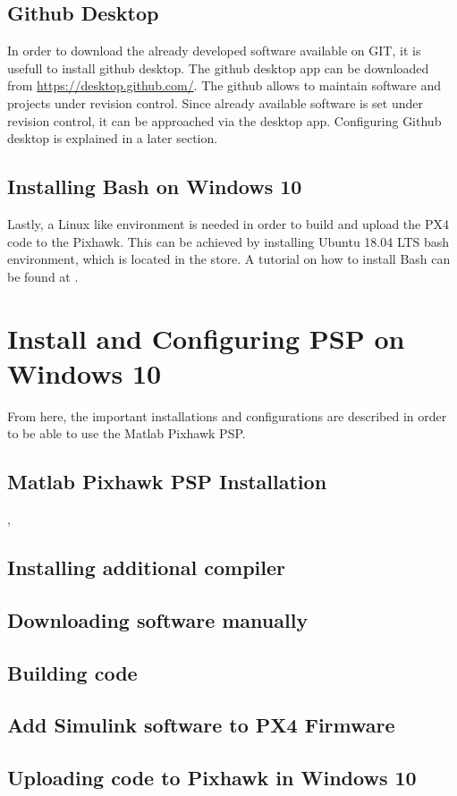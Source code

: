 \subsection{Github Desktop}
In order to download the already developed software available on GIT, it is usefull to install github desktop. The github desktop app can be downloaded from \url{https://desktop.github.com/}. The github allows to maintain software and projects under revision control. Since already available software is set under revision control, it can be approached via the desktop app. Configuring Github desktop is explained in a later section.
\subsection{Installing Bash on Windows 10}
Lastly, a Linux like environment is needed in order to build and upload the PX4 code to the Pixhawk. This can be achieved by installing Ubuntu 18.04 LTS bash environment, which is located in the store. A tutorial on how to install Bash can be found at \cite{BashOnWindows10}.
\section{Install and Configuring PSP on Windows 10}
From here, the important installations and configurations are described in order to be able to use the Matlab Pixhawk PSP. 
\subsection{Matlab Pixhawk PSP Installation}
\cite{MathworksPSP_1}, \cite{MathworksPSP_2}
\subsection{Installing additional compiler}
\subsection{Downloading software manually}
\subsection{Building code}
\subsection{Add Simulink software to PX4 Firmware}
\subsection{Uploading code to Pixhawk in Windows 10}